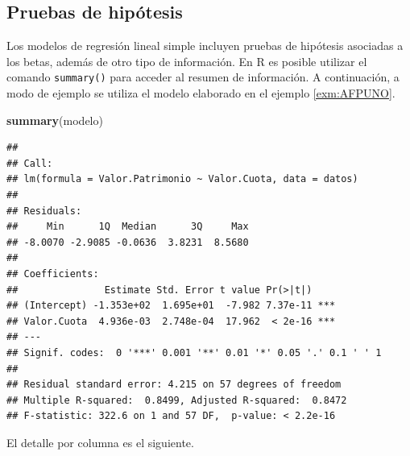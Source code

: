 \documentclass[
  11pt,
]{book}
\newenvironment{Shaded}{\begin{snugshade}}{\end{snugshade}}
\newcommand{\FunctionTok}[1]{\textcolor[rgb]{0.13,0.29,0.53}{\textbf{#1}}}
\newcommand{\NormalTok}[1]{#1}
\theoremstyle{definition}
\theoremstyle{definition}
\theoremstyle{definition}
\theoremstyle{definition}
\theoremstyle{remark}
\begin{document}
\subsection{Pruebas de hipótesis}\label{pruebasHipotesisRLS}

Los modelos de regresión lineal simple incluyen pruebas de hipótesis asociadas a los betas, además de otro tipo de información. En R es posible utilizar el comando \texttt{summary()} para acceder al resumen de información. A continuación, a modo de ejemplo se utiliza el modelo elaborado en el ejemplo \ref{exm:AFPUNO}.

\begin{Shaded}
\begin{Highlighting}[]
\FunctionTok{summary}\NormalTok{(modelo)}
\end{Highlighting}
\end{Shaded}

\begin{verbatim}
## 
## Call:
## lm(formula = Valor.Patrimonio ~ Valor.Cuota, data = datos)
## 
## Residuals:
##     Min      1Q  Median      3Q     Max 
## -8.0070 -2.9085 -0.0636  3.8231  8.5680 
## 
## Coefficients:
##               Estimate Std. Error t value Pr(>|t|)    
## (Intercept) -1.353e+02  1.695e+01  -7.982 7.37e-11 ***
## Valor.Cuota  4.936e-03  2.748e-04  17.962  < 2e-16 ***
## ---
## Signif. codes:  0 '***' 0.001 '**' 0.01 '*' 0.05 '.' 0.1 ' ' 1
## 
## Residual standard error: 4.215 on 57 degrees of freedom
## Multiple R-squared:  0.8499, Adjusted R-squared:  0.8472 
## F-statistic: 322.6 on 1 and 57 DF,  p-value: < 2.2e-16
\end{verbatim}

El detalle por columna es el siguiente.
\end{document}
